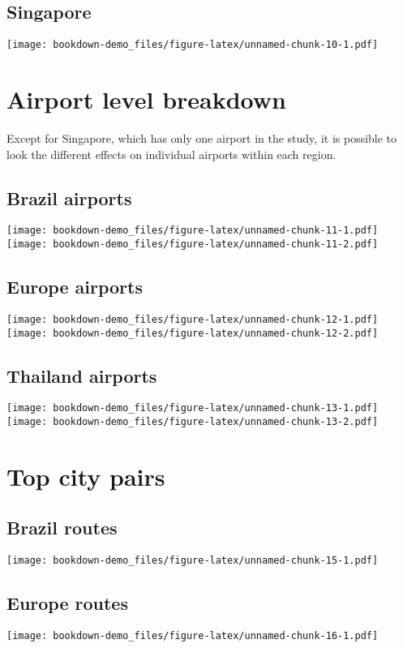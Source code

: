 \documentclass[
]{book}
\begin{document}
\hypertarget{singapore}{%
\section{Singapore}\label{singapore}}

\texttt{[image: bookdown-demo\_files/figure-latex/unnamed-chunk-10-1.pdf]}

\hypertarget{airport-level-breakdown}{%
\chapter{Airport level breakdown}\label{airport-level-breakdown}}

Except for Singapore, which has only one airport in the study, it is possible to look the different effects on individual airports within each region.

\hypertarget{brazil-airports-1}{%
\section{Brazil airports}\label{brazil-airports-1}}

\texttt{[image: bookdown-demo\_files/figure-latex/unnamed-chunk-11-1.pdf]} \texttt{[image: bookdown-demo\_files/figure-latex/unnamed-chunk-11-2.pdf]}

\hypertarget{europe-airports-1}{%
\section{Europe airports}\label{europe-airports-1}}

\texttt{[image: bookdown-demo\_files/figure-latex/unnamed-chunk-12-1.pdf]} \texttt{[image: bookdown-demo\_files/figure-latex/unnamed-chunk-12-2.pdf]}

\hypertarget{thailand-airports-1}{%
\section{Thailand airports}\label{thailand-airports-1}}

\texttt{[image: bookdown-demo\_files/figure-latex/unnamed-chunk-13-1.pdf]} \texttt{[image: bookdown-demo\_files/figure-latex/unnamed-chunk-13-2.pdf]}

\hypertarget{top-city-pairs}{%
\chapter{Top city pairs}\label{top-city-pairs}}

\hypertarget{brazil-routes}{%
\section{Brazil routes}\label{brazil-routes}}

\texttt{[image: bookdown-demo\_files/figure-latex/unnamed-chunk-15-1.pdf]}

\hypertarget{europe-routes}{%
\section{Europe routes}\label{europe-routes}}

\texttt{[image: bookdown-demo\_files/figure-latex/unnamed-chunk-16-1.pdf]}

  
\end{document}
